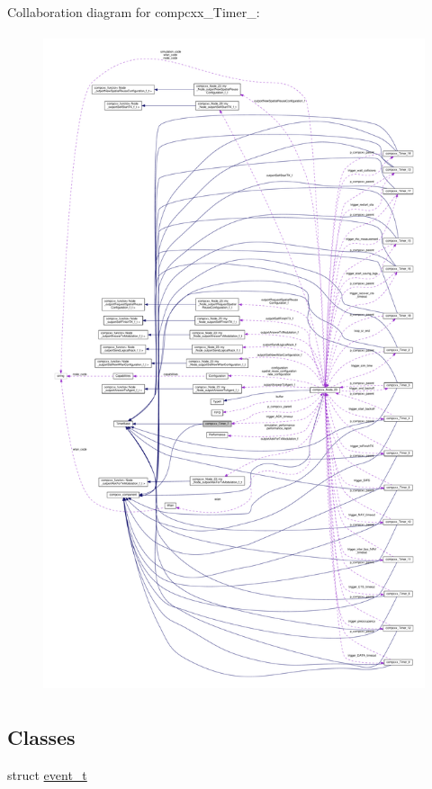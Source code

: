 Collaboration diagram for compcxx\+\_\+\+Timer\+\_\+:\nopagebreak
\begin{figure}[H]
\begin{center}
\leavevmode
\includegraphics[height=550pt]{classcompcxx__Timer__7__coll__graph}
\end{center}
\end{figure}
\subsection*{Classes}
\begin{DoxyCompactItemize}
\item 
struct \hyperlink{structcompcxx__Timer__7_1_1event__t}{event\+\_\+t}
\end{DoxyCompactItemize}
